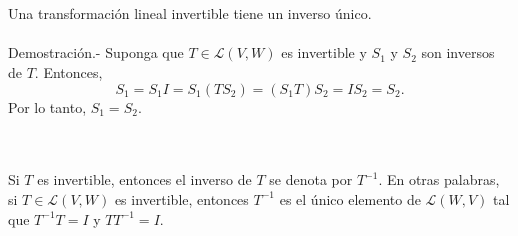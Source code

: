 \begin{myteo}\,\\\\
    Una transformación lineal invertible tiene un inverso único.\\\\
	Demostración.-\; Suponga que $T\in \mathcal{L}(V,W)$ es invertible y $S_1$ y $S_2$ son inversos de $T$. Entonces,
	$$S_1=S_1I=S_1(TS_2)=(S_1T)S_2=IS_2=S_2.$$
	Por lo tanto, $S_1=S_2$.
\end{myteo}

\begin{mynotacion}[\boldmath$T^{-1}$]\,\\\\
    Si $T$ es invertible, entonces el inverso de $T$ se denota por $T^{-1}$. En otras palabras, si $T\in \mathcal{L}(V,W)$ es invertible, entonces $T^{-1}$ es el único elemento de $\mathcal{L}(W,V)$ tal que $T^{-1}T=I$ y $TT^{-1}=I.$
\end{mynotacion}

